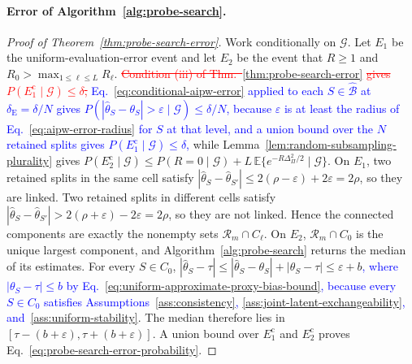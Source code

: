 \paragraph[Error of Algorithm 1.]{ Error of Algorithm~\ref{alg:probe-search}.}
\begin{proof}[ Proof of Theorem~\ref{thm:probe-search-error}]
Work conditionally on $\mathcal G$. Let $E_1$ be the uniform-evaluation-error event and let $E_2$ be the event that $R\ge1$ and $R_0>\max_{1\le\ell\le L}R_\ell$. \textcolor{red}{\sout{Condition (iii) of Thm.~}\ref{thm:probe-search-error}\sout{ gives $P(E_1^{\mathrm c}\mid\mathcal G)\le\delta$,}} \textcolor{blue}{Eq.~\eqref{eq:conditional-aipw-error} applied to each $S\in\widehat{\mathcal B}$ at $\delta_{\mathrm E}=\delta/N$ gives $P(|\widehat\theta_S-\theta_S|>\varepsilon\mid\mathcal G)\le\delta/N$, because $\varepsilon$ is at least the radius of Eq.~\eqref{eq:aipw-error-radius} for $S$ at that level, and a union bound over the $N$ retained splits gives $P(E_1^{\mathrm c}\mid\mathcal G)\le\delta$,} while Lemma~\ref{lem:random-subsampling-plurality} gives $P(E_2^{\mathrm c}\mid\mathcal G)\le P(R=0\mid\mathcal G)+L\,\mathbb E\{e^{-R\Delta_\Pi^2/2}\mid\mathcal G\}$. On $E_1$, two retained splits in the same cell satisfy $|\widehat\theta_S-\widehat\theta_{S'}|\le2(\rho-\varepsilon)+2\varepsilon=2\rho$, so they are linked. Two retained splits in different cells satisfy $|\widehat\theta_S-\widehat\theta_{S'}|>2(\rho+\varepsilon)-2\varepsilon=2\rho$, so they are not linked. Hence the connected components are exactly the nonempty sets $\mathcal R_m\cap C_\ell$. On $E_2$, $\mathcal R_m\cap C_0$ is the unique largest component, and Algorithm~\ref{alg:probe-search} returns the median of its estimates. For every $S\in C_0$, $|\widehat\theta_S-\tau|\le|\widehat\theta_S-\theta_S|+|\theta_S-\tau|\le\varepsilon+b$\textcolor{blue}{, where $|\theta_S-\tau|\le b$ by Eq.~\eqref{eq:uniform-approximate-proxy-bias-bound}, because every $S\in C_0$ satisfies Assumptions~\ref{ass:consistency}, \ref{ass:joint-latent-exchangeability}, and~\ref{ass:uniform-stability}}. The median therefore lies in $[\tau-(b+\varepsilon),\tau+(b+\varepsilon)]$. A union bound over $E_1^{\mathrm c}$ and $E_2^{\mathrm c}$ proves Eq.~\eqref{eq:probe-search-error-probability}.
\end{proof}

